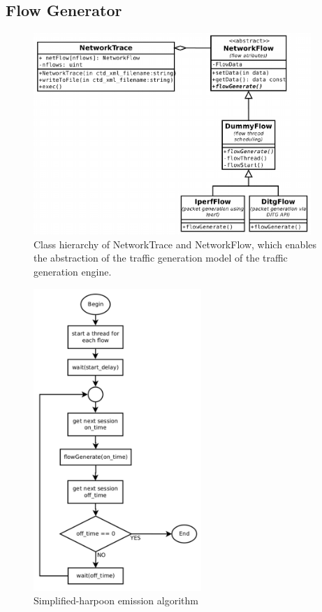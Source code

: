 
\subsection{Flow Generator}

\begin{figure}[ht!]
	\centering
	\includegraphics[height=3.0in]{figures/ch3/trace-flow}
	\caption{Class hierarchy of NetworkTrace and NetworkFlow, which enables the abstraction of the traffic generation model of the traffic generation engine.}
	\label{fig:network-trace-flow-class-diagram}
\end{figure}

\begin{figure}[ht!]
    \centering
    \includegraphics[height=4.5in]{figures/ch3/alg-simplified-harpoon}
    \caption{Simplified-harpoon emission algorithm}
    \label{fig:alg-simplified-harpoon}
\end{figure}



